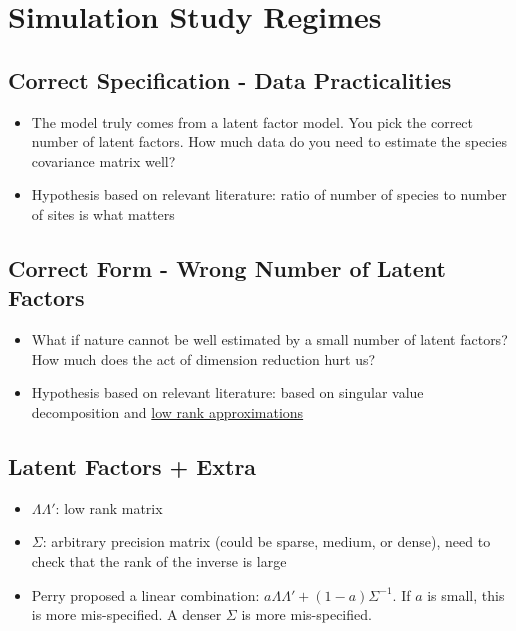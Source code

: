\documentclass[12pt]{amsart}
\begin{document}
\section{Simulation Study Regimes}
\subsection{Correct Specification - Data Practicalities}

\begin{itemize}
\item The model truly comes from a latent factor model. You pick the correct number of latent factors. How much data do you need to estimate the species covariance matrix well?

\item Hypothesis based on relevant literature: ratio of number of species to number of sites is what matters
\end{itemize}
\subsection{Correct Form - Wrong Number of Latent Factors}


\begin{itemize}
\item What if nature cannot be well estimated by a small number of latent factors? How much does the act of dimension reduction hurt us? 

\item Hypothesis based on relevant literature: based on singular value decomposition and \href{https://en.wikipedia.org/wiki/Singular_value_decomposition#Low-rank_matrix_approximation}{low rank approximations}
\end{itemize}
\subsection{Latent Factors + Extra}

\begin{itemize}
\item $\Lambda \Lambda'$: low rank matrix

\item $\Sigma$: arbitrary precision matrix (could be sparse, medium, or dense), need to check that the rank of the inverse is large

\item Perry proposed a linear combination: $a\Lambda \Lambda' + (1-a)\Sigma^{-1}$. If $a$ is small, this is more mis-specified. A denser $\Sigma$ is more mis-specified. 

\end{itemize}
\end{document}
